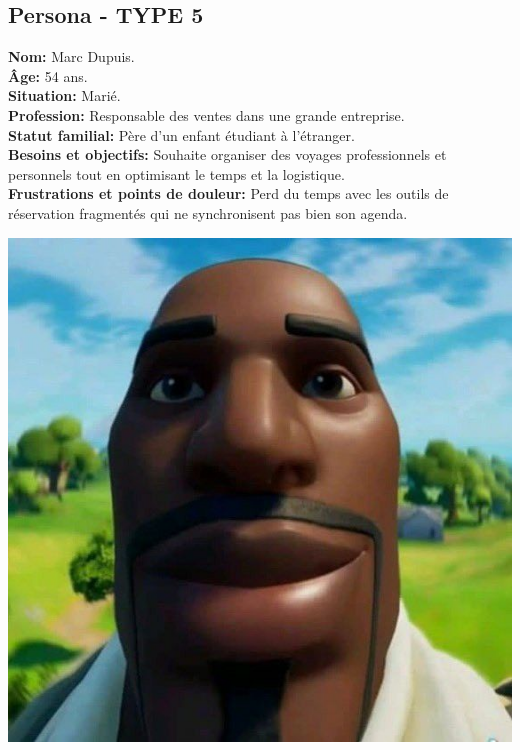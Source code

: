 \documentclass[a4paper,11pt]{article}
\begin{document}
\subsection{Persona - TYPE 5}
\begin{minipage}{0.6\textwidth} %
\textbf{Nom:} Marc Dupuis.\\
\textbf{Âge:} 54 ans.\\
\textbf{Situation:} Marié.\\
\textbf{Profession:} Responsable des ventes dans une grande entreprise.\\
\textbf{Statut familial:} Père d'un enfant étudiant à l'étranger.\\
\textbf{Besoins et objectifs:} Souhaite organiser des voyages professionnels et personnels tout en optimisant le temps et la logistique.\\
\textbf{Frustrations et points de douleur:} Perd du temps avec les outils de réservation fragmentés qui ne synchronisent pas bien son agenda.\\
\end{minipage}%
\hspace{1cm}
\begin{minipage}{0.3\textwidth} %
    \begin{center}
        \includegraphics[width=\textwidth]{images/pnj.jpg} %
    \end{center}
\end{minipage}
\end{document}
